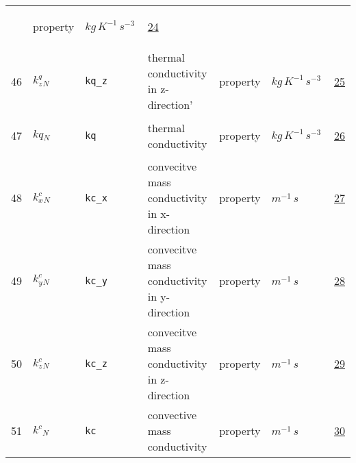 \begin{longtable}{|p{1cm}|p{2.5cm}|p{4.5cm}|p{8cm}|p{3.0cm}|p{3cm}|p{1cm}|}
             & \begin{lay}property \end{lay}
             & $ kg \,K^{-1} \,s^{-3} \, $
             & \hyperlink{"e:24"}{ 24 }
                 \\
    46
             & \hypertarget{"v:46"}{ $ {{k^q_z}}{_{N}} $}
             & \verb|kq_z|
             & thermal conductivity in z-direction'
             & \begin{lay}property \end{lay}
             & $ kg \,K^{-1} \,s^{-3} \, $
             & \hyperlink{"e:25"}{ 25 }
                 \\
    47
             & \hypertarget{"v:47"}{ $ {kq}{_{N}} $}
             & \verb|kq|
             & thermal conductivity
             & \begin{lay}property \end{lay}
             & $ kg \,K^{-1} \,s^{-3} \, $
             & \hyperlink{"e:26"}{ 26 }
                 \\
    48
             & \hypertarget{"v:48"}{ $ {{k^c_x}}{_{N}} $}
             & \verb|kc_x|
             & convecitve mass conductivity in x-direction
             & \begin{lay}property \end{lay}
             & $ m^{-1} \,s \, $
             & \hyperlink{"e:27"}{ 27 }
                 \\
    49
             & \hypertarget{"v:49"}{ $ {{k^c_y}}{_{N}} $}
             & \verb|kc_y|
             & convecitve mass conductivity in y-direction
             & \begin{lay}property \end{lay}
             & $ m^{-1} \,s \, $
             & \hyperlink{"e:28"}{ 28 }
                 \\
    50
             & \hypertarget{"v:50"}{ $ {{k^c_z}}{_{N}} $}
             & \verb|kc_z|
             & convecitve mass conductivity in z-direction
             & \begin{lay}property \end{lay}
             & $ m^{-1} \,s \, $
             & \hyperlink{"e:29"}{ 29 }
                 \\
    51
             & \hypertarget{"v:51"}{ $ {{k^c}}{_{N}} $}
             & \verb|kc|
             & convective mass conductivity
             & \begin{lay}property \end{lay}
             & $ m^{-1} \,s \, $
             & \hyperlink{"e:30"}{ 30 }

\end{longtable}

